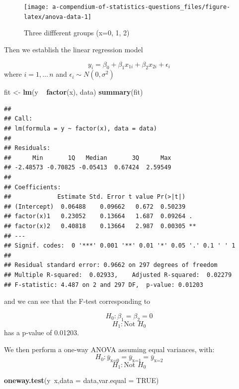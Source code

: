 \documentclass[]{book}
\newenvironment{Shaded}{\begin{snugshade}}{\end{snugshade}}
\newcommand{\KeywordTok}[1]{\textcolor[rgb]{0.13,0.29,0.53}{\textbf{{#1}}}}
\newcommand{\DataTypeTok}[1]{\textcolor[rgb]{0.13,0.29,0.53}{{#1}}}
\newcommand{\StringTok}[1]{\textcolor[rgb]{0.31,0.60,0.02}{{#1}}}
\newcommand{\OtherTok}[1]{\textcolor[rgb]{0.56,0.35,0.01}{{#1}}}
\newcommand{\NormalTok}[1]{{#1}}
\theoremstyle{definition}
\theoremstyle{definition}
\theoremstyle{remark}
\begin{document}
\begin{figure}

{\centering \texttt{[image: a-compendium-of-statistics-questions\_files/figure-latex/anova-data-1]} 

}

\caption{Three diffferent groups (x=0, 1, 2)}\label{fig:anova-data}
\end{figure}

Then we establish the linear regression model

\[
y_i = \beta_0 + \beta_1 x_{1i} + \beta_2 x_{2i} + \epsilon_i
\] where \(i=1,\dots\,n\) and \(\epsilon_i \sim N(0,\sigma^2)\)

\begin{Shaded}
\begin{Highlighting}[]
\NormalTok{fit <-}\StringTok{ }\KeywordTok{lm}\NormalTok{(y ~}\StringTok{ }\KeywordTok{factor}\NormalTok{(x), data)}
\KeywordTok{summary}\NormalTok{(fit)}
\end{Highlighting}
\end{Shaded}

\begin{verbatim}
## 
## Call:
## lm(formula = y ~ factor(x), data = data)
## 
## Residuals:
##      Min       1Q   Median       3Q      Max 
## -2.48573 -0.70825 -0.05413  0.67424  2.59549 
## 
## Coefficients:
##             Estimate Std. Error t value Pr(>|t|)   
## (Intercept)  0.06488    0.09662   0.672  0.50239   
## factor(x)1   0.23052    0.13664   1.687  0.09264 . 
## factor(x)2   0.40818    0.13664   2.987  0.00305 **
## ---
## Signif. codes:  0 '***' 0.001 '**' 0.01 '*' 0.05 '.' 0.1 ' ' 1
## 
## Residual standard error: 0.9662 on 297 degrees of freedom
## Multiple R-squared:  0.02933,    Adjusted R-squared:  0.02279 
## F-statistic: 4.487 on 2 and 297 DF,  p-value: 0.01203
\end{verbatim}

and we can see that the F-test corresponding to

\[
H_0: \beta_1 = \beta_2 = 0
\] \[
H_1: \text{Not } H_0
\] has a p-value of 0.01203.

We then perform a one-way ANOVA assuming equal variances, with: \[
H_0: \bar{y}_{\text{x=0}} = \bar{y}_{\text{x=1}} = \bar{y}_{\text{x=2}}
\] \[
H_1: \text{Not } H_0
\]

\begin{Shaded}
\begin{Highlighting}[]
\KeywordTok{oneway.test}\NormalTok{(y~x,}\DataTypeTok{data =} \NormalTok{data,}\DataTypeTok{var.equal =} \OtherTok{TRUE}\NormalTok{)}
\end{Highlighting}
\end{Shaded}
\end{document}
